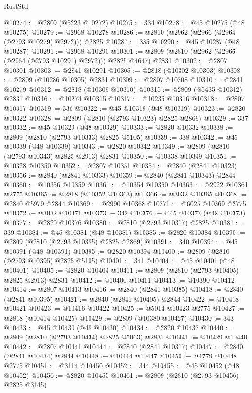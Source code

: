 \begin{lexlean}{RustStd}
\begin{coremodule}
@10274 := @2809 (@5223 @10272)
@10275 := 334
@10278 := @45 @10275 (@48 @10275)
@10279 := @2968 @10278
@10286 := @2810 (@2962 (@2966 (@2964 (@2793 @10279) @2972))) @2825
@10287 := 335
@10290 := @45 @10287 (@48 @10287)
@10291 := @2968 @10290
@10301 := @2809 (@2810 (@2962 (@2966 (@2964 (@2793 @10291) @2972))) @2825 @4647) @2831
@10302 := @2807 @10301
@10303 := @2841 @10291
@10305 := @2818 (@10302 @10303)
@10308 := @2809 (@10286 @10305) @2831
@10309 := @2807 @10308
@10310 := @2841 @10279
@10312 := @2818 (@10309 @10310)
@10315 := @2809 (@5435 @10312) @2831
@10316 := @10274 @10315
@10317 := @10235 @10316
@10318 := @2807 @10317
@10319 := 336
@10322 := @45 @10319 (@48 @10319)
@10323 := @2820 @10322
@10328 := @2809 (@2810 (@2793 @10323) @2825 @2869)
@10329 := 337
@10332 := @45 @10329 (@48 @10329)
@10333 := @2820 @10332
@10338 := @2809 (@2810 (@2793 @10333) @2825 @5105)
@10339 := 338
@10342 := @45 @10339 (@48 @10339)
@10343 := @2820 @10342
@10349 := @2809 (@2810 (@2793 @10343) @2825 @2913) @2831
@10350 := @10338 @10349
@10351 := @10328 @10350
@10352 := @2807 @10351
@10354 := @2840 (@2841 @10323)
@10356 := @2840 (@2841 @10333)
@10359 := @2840 (@2841 @10343) @2844
@10360 := @10356 @10359
@10361 := @10354 @10360
@10363 := @2922 @10361 @2775
@10365 := @2818 (@10352 @10363)
@10366 := @3032 @10365
@10368 := @2840 @5979 @2844
@10369 := @2990 @10368
@10371 := @6025 @10369 @2775
@10372 := @3032 @10371
@10373 := 342
@10376 := @45 @10373 (@48 @10373)
@10377 := @2820 @10376
@10380 := @2810 (@2793 @10377) @2825
@10381 := 339
@10384 := @45 @10381 (@48 @10381)
@10385 := @2820 @10384
@10390 := @2809 (@2810 (@2793 @10385) @2825 @2869)
@10391 := 340
@10394 := @45 @10391 (@48 @10391)
@10395 := @2820 @10394
@10400 := @2809 (@2810 (@2793 @10395) @2825 @5105)
@10401 := 341
@10404 := @45 @10401 (@48 @10401)
@10405 := @2820 @10404
@10411 := @2809 (@2810 (@2793 @10405) @2825 @2913) @2831
@10412 := @10400 @10411
@10413 := @10390 @10412
@10414 := @2807 @10413
@10416 := @2840 (@2841 @10385)
@10418 := @2840 (@2841 @10395)
@10421 := @2840 (@2841 @10405) @2844
@10422 := @10418 @10421
@10423 := @10416 @10422
@10425 := @5014 @10423 @2775
@10427 := @2818 (@10414 @10425)
@10429 := @2809 (@10380 @10427)
@10430 := 343
@10433 := @45 @10430 (@48 @10430)
@10434 := @2820 @10433
@10440 := @2809 (@2810 (@2793 @10434) @2825 @5063) @2831
@10441 := @10429 @10440
@10442 := @2807 @10441
@10444 := @2840 (@2841 @10377)
@10447 := @2840 (@2841 @10434) @2844
@10448 := @10444 @10447
@10450 := @4779 @10448 @2775
@10451 := @3114 @10450
@10452 := 344
@10455 := @45 @10452 (@48 @10452)
@10456 := @2820 @10455
@10461 := @2809 (@2810 (@2793 @10456) @2825 @3145)

\end{coremodule}
\end{lexlean}
